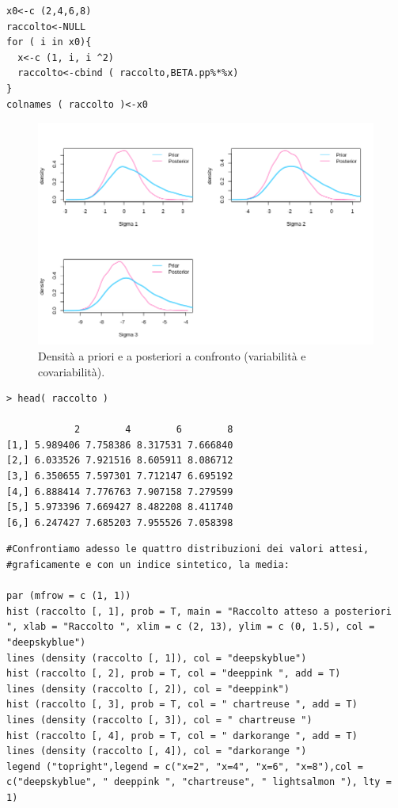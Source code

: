 \begin{lstlisting}[style=R]
x0<-c (2,4,6,8)
raccolto<-NULL
for ( i in x0){
  x<-c (1, i, i ^2)
  raccolto<-cbind ( raccolto,BETA.pp%*%x)
}
colnames ( raccolto )<-x0
\end{lstlisting}


\begin{figure}
    \centering
    \includegraphics[totalheight=10cm]{img/esercizio11-2-4.png}
    \caption{  Densità a priori e a posteriori a confronto (variabilità e covariabilità).}
\end{figure}

{
\color{red}
\begin{Verbatim}
> head( raccolto )

            2        4        6        8
[1,] 5.989406 7.758386 8.317531 7.666840
[2,] 6.033526 7.921516 8.605911 8.086712
[3,] 6.350655 7.597301 7.712147 6.695192
[4,] 6.888414 7.776763 7.907158 7.279599
[5,] 5.973396 7.669427 8.482208 8.411740
[6,] 6.247427 7.685203 7.955526 7.058398
\end{Verbatim}
}

\begin{lstlisting}[style=R]
#Confrontiamo adesso le quattro distribuzioni dei valori attesi,
#graficamente e con un indice sintetico, la media:

par (mfrow = c (1, 1))
hist (raccolto [, 1], prob = T, main = "Raccolto atteso a posteriori ", xlab = "Raccolto ", xlim = c (2, 13), ylim = c (0, 1.5), col = "deepskyblue")
lines (density (raccolto [, 1]), col = "deepskyblue")
hist (raccolto [, 2], prob = T, col = "deeppink ", add = T)
lines (density (raccolto [, 2]), col = "deeppink")
hist (raccolto [, 3], prob = T, col = " chartreuse ", add = T)
lines (density (raccolto [, 3]), col = " chartreuse ")
hist (raccolto [, 4], prob = T, col = " darkorange ", add = T)
lines (density (raccolto [, 4]), col = "darkorange ")
legend ("topright",legend = c("x=2", "x=4", "x=6", "x=8"),col = c("deepskyblue", " deeppink ", "chartreuse", " lightsalmon "), lty = 1)
\end{lstlisting}

